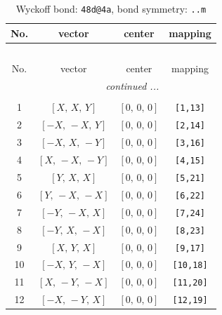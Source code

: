 \documentclass[fleqn,8pt]{jsarticle}
\begin{document}
\renewcommand{\arraystretch}{1.2}
\begin{longtable}{cccc}
\caption{Wyckoff bond: {\tt 48d@4a}, bond symmetry: {\tt ..m}}
 \\
 \hline \hline
No. & vector & center & mapping \\ \hline \endfirsthead

\multicolumn{3}{l}{\tablename\ \thetable{}} \\
 \hline \hline
No. & vector & center & mapping \\ \hline \endhead

 \hline \hline
\multicolumn{3}{r}{\footnotesize\it continued ...} \\ \endfoot

 \hline \hline
\multicolumn{3}{r}{} \\ \endlastfoot

1 & $\left[ X,\, X,\, Y \right]$ & $\left[ 0,\, 0,\, 0 \right]$ & {\tt [1,13]} \\ \hline
2 & $\left[ - X,\, - X,\, Y \right]$ & $\left[ 0,\, 0,\, 0 \right]$ & {\tt [2,14]} \\ \hline
3 & $\left[ - X,\, X,\, - Y \right]$ & $\left[ 0,\, 0,\, 0 \right]$ & {\tt [3,16]} \\ \hline
4 & $\left[ X,\, - X,\, - Y \right]$ & $\left[ 0,\, 0,\, 0 \right]$ & {\tt [4,15]} \\ \hline
5 & $\left[ Y,\, X,\, X \right]$ & $\left[ 0,\, 0,\, 0 \right]$ & {\tt [5,21]} \\ \hline
6 & $\left[ Y,\, - X,\, - X \right]$ & $\left[ 0,\, 0,\, 0 \right]$ & {\tt [6,22]} \\ \hline
7 & $\left[ - Y,\, - X,\, X \right]$ & $\left[ 0,\, 0,\, 0 \right]$ & {\tt [7,24]} \\ \hline
8 & $\left[ - Y,\, X,\, - X \right]$ & $\left[ 0,\, 0,\, 0 \right]$ & {\tt [8,23]} \\ \hline
9 & $\left[ X,\, Y,\, X \right]$ & $\left[ 0,\, 0,\, 0 \right]$ & {\tt [9,17]} \\ \hline
10 & $\left[ - X,\, Y,\, - X \right]$ & $\left[ 0,\, 0,\, 0 \right]$ & {\tt [10,18]} \\ \hline
11 & $\left[ X,\, - Y,\, - X \right]$ & $\left[ 0,\, 0,\, 0 \right]$ & {\tt [11,20]} \\ \hline
12 & $\left[ - X,\, - Y,\, X \right]$ & $\left[ 0,\, 0,\, 0 \right]$ & {\tt [12,19]} \\
\end{longtable}
\renewcommand{\arraystretch}{1.2}
\end{document}
